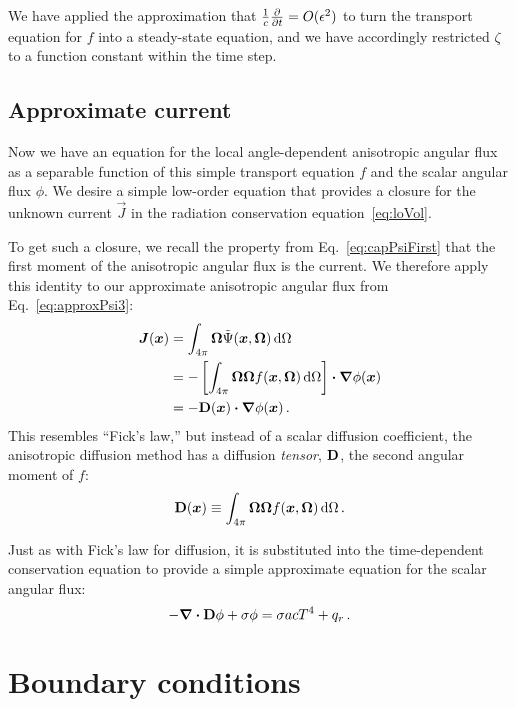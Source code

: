 We have applied the approximation that $\frac{1}{c}\frac{\partial }{\partial t}= O(\epsilon^2)$
to turn the transport equation for $f$ into a steady-state equation, and we have
accordingly restricted $\zeta$ to a function constant within the time step.

\subsection{Approximate current}
Now we have an equation for the local angle-dependent anisotropic angular flux as a
separable
function of this simple transport equation $f$ and the scalar angular flux $\phi$.
We desire a simple low-order equation that provides a closure for the unknown
current $\vec{J}$ in the radiation conservation
equation~\eqref{eq:loVol}.

To get such a closure, we recall the property from Eq.~\eqref{eq:capPsiFirst}
that the first moment of the anisotropic angular flux is the current. We
therefore apply this identity to our approximate anisotropic angular flux from
Eq.~\eqref{eq:approxPsi3}:
\begin{align} \nonumber
  \bm{J}(\bm{x})
  &= \int_{4\pi} \bm{\Omega} \tilde \Psi(\bm{x}, \bm{\Omega}) \mathop{}\!\mathrm{d}\Omega
  \\ \nonumber
  &= 
  - \left[ \int_{4\pi} \bm{\Omega} \bm{\Omega} f(\bm{x}, \bm{\Omega})
  \mathop{}\!\mathrm{d}\Omega \right]
  \bm{\cdot} \bm{\nabla} \phi(\bm{x})
  \\ \label{eq:anisotropicFicks}
  &= - \mathbf{D}(\bm{x}) \bm{\cdot} \bm{\nabla} \phi(\bm{x}) \,.
\end{align}
This resembles ``Fick's law,'' but instead of a scalar diffusion coefficient,
the anisotropic diffusion method has a diffusion \emph{tensor}, $\mathbf{D}$, the
second angular moment of $f$:
\begin{equation}\label{eq:dDefinition}
  \mathbf{D}(\bm{x}) \equiv \int_{4\pi} \bm{\Omega} \bm{\Omega}
  f(\bm{x}, \bm{\Omega}) \mathop{}\!\mathrm{d}\Omega \,.
\end{equation}

Just as with Fick's law for diffusion, it is
substituted into the time-dependent conservation equation to provide a simple
approximate equation for the scalar angular flux:
\begin{equation*}
  -\bm{\nabla} \bm{\cdot} \mathbf{D} \phi + \sigma \phi = \sigma ac T^4 + q_{r} \,.
\end{equation*}

\section{Boundary conditions}\label{sec:derBc}

